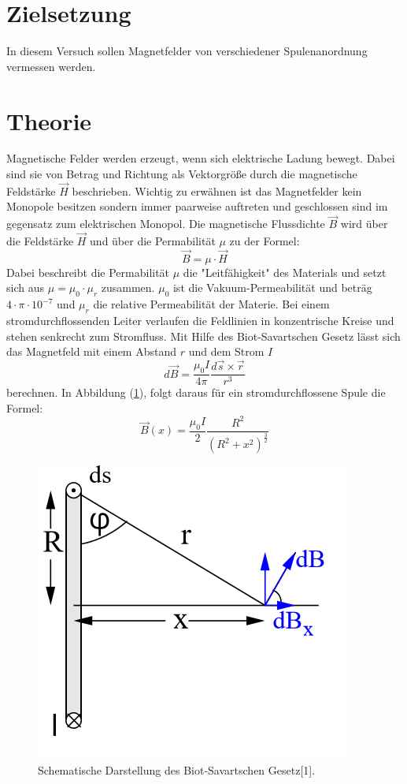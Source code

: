 \section{Zielsetzung}
In diesem Versuch sollen Magnetfelder von verschiedener Spulenanordnung vermessen werden.
\section{Theorie}
Magnetische Felder werden erzeugt, wenn sich elektrische Ladung bewegt.
Dabei sind sie von Betrag und Richtung als Vektorgröße durch die magnetische Feldstärke
$\vec{H}$ beschrieben. Wichtig zu erwähnen ist das Magnetfelder kein Monopole besitzen
sondern immer paarweise auftreten und geschlossen sind im gegensatz zum elektrischen Monopol.
Die magnetische Flussdichte $\vec{B}$ wird über die Feldstärke $\vec{H}$ und über die
Permabilität $\mu$ zu der Formel:
\begin{equation}
  \vec{B} = \mu \cdot \vec{H}
  \label{eq:1}
\end{equation}
Dabei beschreibt die Permabilität $\mu$ die "Leitfähigkeit" des Materials und setzt sich
aus $\mu = \mu_0 \cdot \mu_r$ zusammen. $\mu_0$ ist die Vakuum-Permeabilität und beträg $4 \cdot \pi \cdot 10^{-7}$
und $\mu_r$ die relative Permeabilität der Materie.
Bei einem stromdurchflossenden Leiter verlaufen die Feldlinien in konzentrische Kreise und
stehen senkrecht zum Stromfluss. Mit Hilfe des Biot-Savartschen Gesetz lässt sich
das Magnetfeld mit einem Abstand $r$ und dem Strom $I$
\begin{equation*}
  d\vec{B} = \frac{\mu_0 I}{4\pi} \frac{d\vec{s} \times \vec{r}}{r^3}
\end{equation*}
berechnen. In Abbildung (\ref{abb:1}), folgt daraus für ein stromdurchflossene Spule die Formel:
\begin{equation}
  \vec{B}(x) = \frac{\mu_0 I}{2} \frac{R^2}{(R^2 + x^2)^{\frac{3}{2}}}
  \label{eq:2}
\end{equation}
\begin{figure}[H]
  \includegraphics[width=5 cm , height=3.5 cm]{Abb1.png}
	\caption{Schematische Darstellung des Biot-Savartschen Gesetz[1].}
	\label{abb:1}
\end{figure}
